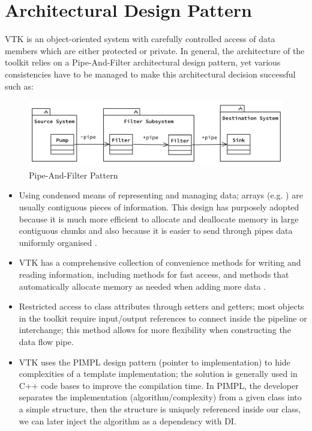 
\section{Architectural Design Pattern}

VTK is an object-oriented system with carefully controlled access of data members which are either protected or private.  In general, the architecture of the toolkit relies on a Pipe-And-Filter architectural design pattern, yet various consistencies have to be managed to make this architectural decision successful such as:

\begin{figure}[h!]
    \centering
    \includegraphics[width=15cm]{diagrams/filter-pipe.png}
    \caption{Pipe-And-Filter Pattern}
    \label{fig::design::pattern}
\end{figure}


\begin{itemize}

    \item Using condensed means of representing and managing data; arrays (e.g. ) are usually contiguous pieces of information. This design has purposely adopted because it is much more efficient to allocate and deallocate memory in large contiguous chunks and also because it is easier to send through pipes data uniformly organised \cite{aosabook}.
    
    \item VTK has a comprehensive collection of convenience methods for writing and reading information, including methods for fast access, and methods that automatically allocate memory as needed when adding more data \cite{aosabook}.
	
    \item Restricted access to class attributes through setters and getters; most objects in the toolkit require input/output references to connect inside the pipeline or interchange; this method allows for more flexibility when constructing the data flow pipe.

    \item VTK uses the PIMPL design pattern (pointer to implementation) to hide complexities of a template implementation; the solution is generally used in C++ code bases to improve the compilation time.  In  PIMPL, the developer separates the implementation (algorithm/complexity) from a given class into a simple structure, then the structure is uniquely referenced inside our class, we can later inject the algorithm as a dependency with DI. 
    
\end{itemize}
 
